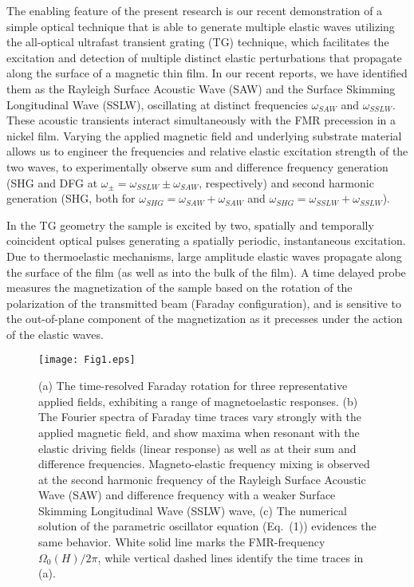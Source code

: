 \documentclass[aps,showpacs,prb,twocolumn,superscriptaddress]{revtex4}
\begin{document}
The enabling feature of the present research is our recent demonstration of a simple optical technique that is able to generate multiple elastic waves utilizing the all-optical ultrafast transient grating (TG) technique\cite{Janusonis2016_1}, which facilitates the excitation and detection of multiple distinct elastic perturbations that propagate along the surface of a magnetic thin film. In our recent reports, we have identified them as the Rayleigh Surface Acoustic Wave (SAW) and the Surface Skimming Longitudinal Wave (SSLW), oscillating at distinct frequencies $\omega_{SAW}$ and $\omega_{SSLW}$. These acoustic transients interact simultaneously with the FMR precession in a nickel film. Varying the applied magnetic field and underlying substrate material allows us to engineer the frequencies and relative elastic excitation strength of the two waves, to experimentally observe sum and difference frequency generation (SHG and DFG at $\omega_{\pm}=\omega_{SSLW}\pm\omega_{SAW}$, respectively) and second harmonic generation (SHG, both for $\omega_{SHG}=\omega_{SAW}+\omega_{SAW}$ and $\omega_{SHG}=\omega_{SSLW}+\omega_{SSLW}$). 

In the TG geometry the sample is excited by two, spatially and temporally coincident optical pulses generating a spatially periodic, instantaneous excitation.  Due to thermoelastic mechanisms, large amplitude elastic waves propagate along the surface of the film (as well as into the bulk of the film).  A time delayed probe measures the magnetization of the sample based on the rotation of the polarization of the transmitted beam (Faraday configuration), and is sensitive to the out-of-plane component of the magnetization as it precesses under the action of the elastic waves. 

\begin{figure}
    \centering
    \texttt{[image: Fig1.eps]}
    \caption{ 
    (a) The time-resolved Faraday rotation for three representative applied fields, exhibiting a range of magnetoelastic responses. (b) The Fourier spectra of Faraday time traces vary strongly with the applied magnetic field, and show maxima when resonant with the elastic driving fields (linear response) as well as at their sum and difference frequencies. Magneto-elastic frequency mixing is observed at the second harmonic frequency of the Rayleigh Surface Acoustic Wave (SAW) and difference frequency with a weaker Surface Skimming Longitudinal Wave (SSLW) wave, (c) The numerical solution of the parametric oscillator equation (Eq.~(1)) evidences the same behavior. White solid line marks the FMR-frequency $\Omega_0(H)/2\pi$, while vertical dashed lines identify the time traces in (a).}
    \label{fig:experimental}
\end{figure}
\end{document}
